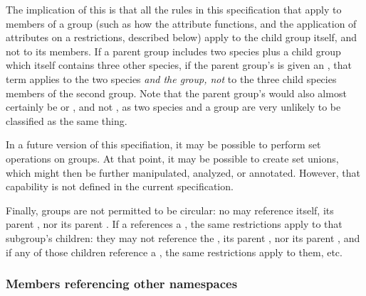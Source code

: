 The implication of this is that all the rules in this specification that apply to members of a group (such as how the  attribute functions, and the application of  attributes on a \ListOfMembers restrictions, described below) apply to the child group itself, and not to its members.  If a parent group includes two species plus a child group which itself contains three other species, if the parent group's \ListOfMembers is given an , that term applies to the two species \emph{and the group, not} to the three child species members of the second group.  Note that the parent group's  would also almost certainly be  or , and not , as two species and a group are very unlikely to be classified as the same thing.

In a future version of this specifiation, it may be possible to perform set operations on groups.  At that point, it may be possible to create set unions, which might then be further manipulated, analyzed, or annotated.  However, that capability is not defined in the current specification.

Finally, groups are not permitted to be circular:  no \Member may reference itself, its parent \ListOfMembers, nor its parent \Group.  If a \Member references a \Group, the same restrictions apply to that subgroup's children:  they may not reference the \Member, its parent \ListOfMembers, nor its parent \Group, and if any of those children reference a \Group, the same restrictions apply to them, etc.

\subsubsection{Members referencing other namespaces}
\label{unfindable-members}

